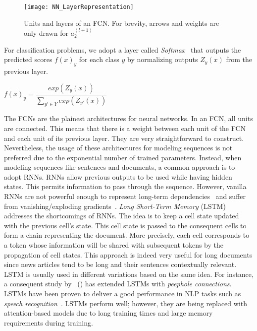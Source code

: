 \begin{figure}
    \centering
    \texttt{[image: NN\_LayerRepresentation]}
    \caption[Units and layers of an FCN]{Units and layers of an FCN. For brevity, arrows and weights are only drawn for $a_2^{(l+1)}$}
    \label{fig:NN_LayerRepresentation}
\end{figure}
For classification problems, we adopt a layer called \emph{Softmax}~\parencite{Softmax_Bridle} that outputs the predicted scores $f(x)_y$ for each class $y$ by normalizing outputs $Z_y(x)$ from the previous layer.\\
\begin{center}
    $f(x)_y = \dfrac{exp(Z_y(x))}{\sum\limits_{{y'} \in Y} exp(Z_{y'}(x))}$
\end{center}
The FCNs are the plainest architectures for neural networks. In an FCN, all units are connected. This means that there is a weight between each unit of the FCN and each unit of its previous layer. They are very straightforward to construct. Nevertheless, the usage of these architectures for modeling sequences is not preferred due to the exponential number of trained parameters. Instead, when modeling sequences like sentences and documents, a common approach is to adopt RNNs. RNNs allow previous outputs to be used while having hidden states. This permits information to pass through the sequence. However, vanilla RNNs are not powerful enough to represent long-term dependencies~\parencite{LearningLongTermDependenciesHard_Bengio} and suffer from vanishing/exploding gradients~\parencite{OnTheDifficultyOfTrainingRNNs_Pascanu}. \emph{Long Short-Term Memory} (LSTM)~\parencite{LSTM_Hochreiter} addresses the shortcomings of RNNs. The idea is to keep a cell state updated with the previous cell's state. This cell state is passed to the consequent cells to form a chain representing the document. More precisely, each cell corresponds to a token whose information will be shared with subsequent tokens by the propagation of cell states. This approach is indeed very useful for long documents since news articles tend to be long and their sentences contextually relevant. LSTM is usually used in different variations based on the same idea. For instance, a consequent study by~\citeauthor{LSTMPeephole_Gers} (\citeyear{LSTMPeephole_Gers}) has extended LSTMs with \emph{peephole connections}. LSTMs have been proven to deliver a good performance in NLP tasks such as \emph{speech recognition}~\parencite{AchievingHumanParityinConvSR_Wayne}. LSTMs perform well; however, they are being replaced with attention-based models due to long training times and large memory requirements during training.\\

